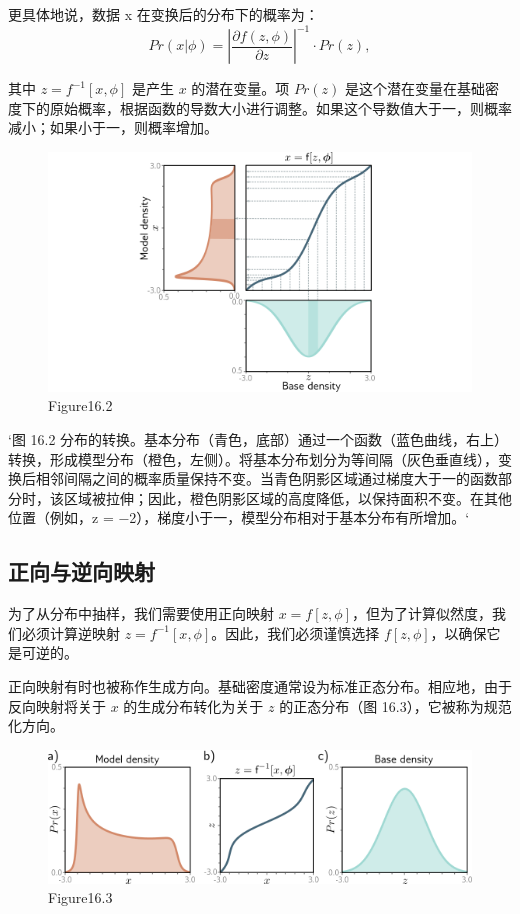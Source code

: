 更具体地说，数据 x 在变换后的分布下的概率为：
\[
Pr(x|\phi) = \left| \frac{\partial f(z, \phi)}{\partial z} \right|^{-1} \cdot Pr(z), \tag{16.1}
\]

其中 \(z = f^{-1}[x, \phi]\) 是产生 \(x\) 的潜在变量。项 \(Pr(z)\) 是这个潜在变量在基础密度下的原始概率，根据函数的导数大小进行调整。如果这个导数值大于一，则概率减小；如果小于一，则概率增加。

\begin{figure}[h!]
\centering
\includegraphics[width=0.7\linewidth]{png/chapter16/FlowIntroTransformDensity.png}
\caption{Figure16.2}
\end{figure}

`图 16.2 分布的转换。基本分布（青色，底部）通过一个函数（蓝色曲线，右上）转换，形成模型分布（橙色，左侧）。将基本分布划分为等间隔（灰色垂直线），变换后相邻间隔之间的概率质量保持不变。当青色阴影区域通过梯度大于一的函数部分时，该区域被拉伸；因此，橙色阴影区域的高度降低，以保持面积不变。在其他位置（例如，z = −2），梯度小于一，模型分布相对于基本分布有所增加。`

\subsection{正向与逆向映射}
为了从分布中抽样，我们需要使用正向映射 \(x = f[z, \phi]\)，但为了计算似然度，我们必须计算逆映射 \(z = f^{-1}[x, \phi]\)。因此，我们必须谨慎选择 \(f[z, \phi]\)，以确保它是可逆的。

正向映射有时也被称作生成方向。基础密度通常设为标准正态分布。相应地，由于反向映射将关于 \(x\) 的生成分布转化为关于 \(z\) 的正态分布（图 16.3），它被称为规范化方向。

\begin{figure}[h!]
\centering
\includegraphics[width=0.7\linewidth]{png/chapter16/FlowIntroInverse.png}
\caption{Figure16.3}
\end{figure}


